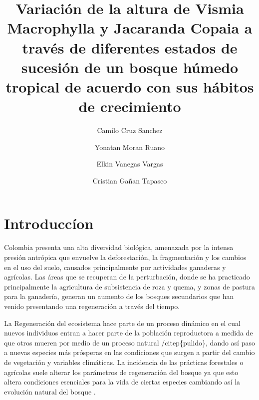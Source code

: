\documentclass[letterpaper,9pt,twocolumn,twoside,]{pinp}
\title{Variación de la altura de Vismia Macrophylla y Jacaranda Copaia a través
de diferentes estados de sucesión de un bosque húmedo tropical de
acuerdo con sus hábitos de crecimiento}
\author[a]{Camilo Cruz Sanchez}
\author[a]{Yonatan Moran Ruano}
\author[a]{Elkin Vanegas Vargas}
\author[a]{Cristian Gañan Tapasco}
\affil[a]{Departamento de ciencias forestales, Univeridad Nacional de Colombia,
Medellín}
\begin{document}
\verticaladjustment{-2pt}

\maketitle
\thispagestyle{firststyle}



\hypertarget{introduccuxedon}{%
\section{Introduccíon}\label{introduccuxedon}}

Colombia presenta una alta diversidad biológica, amenazada por la
intensa presión antrópica que envuelve la deforestación, la
fragmentación y los cambios en el uso del suelo, causados principalmente
por actividades ganaderas y agrícolas.\citep{salas} Las áreas que se
recuperan de la perturbación, donde se ha practicado principalmente la
agricultura de subsistencia de roza y quema, y zonas de pastura para la
ganadería, generan un aumento de los bosques secundarios\citep{hammer}
que han venido presentando una regeneración a través del tiempo.

La Regeneración del ecosistema hace parte de un proceso dinámico en el
cual nuevos individuos entran a hacer parte de la población reproductora
a medida de que otros mueren por medio de un proceso natural
/citep\{pulido\}, dando así paso a nuevas especies más prósperas en las
condiciones que surgen a partir del cambio de vegetación y variables
climáticas. La incidencia de las prácticas forestales o agrícolas suele
alterar los parámetros de regeneración del bosque ya que esto altera
condiciones esenciales para la vida de ciertas especies cambiando así la
evolución natural del bosque \citep{pulido}.
\end{document}

